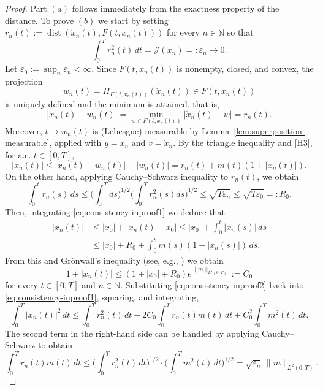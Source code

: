 \documentclass[11pt]{elsarticle}
\theoremstyle{definition}
\theoremstyle{remark}
\numberwithin{equation}{section}
\begin{document}
	\begin{proof}
		Part $(a)$ follows immediately from the exactness property of the distance. To prove $(b)$ we start by setting $r_n(t) := \operatorname{dist}(\dot{x}_n(t), F(t, x_n(t)))$ for every $n\in\mathbb{N}$ so that
		\[
		\int_0^T r_n^2(t) \, dt = \mathcal{J}(x_n) =: \varepsilon_n \to 0.
		\]
		Let $\varepsilon_0 := \sup_n \varepsilon_n < \infty$. Since  $F(t, x_n(t))$ is nonempty, closed,  and convex, the projection
		\[
		w_n(t) = \Pi_{F(t, x_n(t))}(\dot{x}_n(t)) \in F(t, x_n(t))
		\]
		is uniquely defined and the minimum is attained, that is,
		\[
		|\dot{x}_n(t) - w_n(t)| =\min_{w\in F(t, x_n(t))} |\dot{x}_n(t) - w| =r_n(t).
		\]
		Moreover, $t\mapsto w_n(t)$ is (Lebesgue) measurable by
		Lemma~\ref{lem:superposition-measurable}, applied with $y=x_n$ and
		$v=\dot{x}_n$.
		By the triangle inequality and \ref{H3}, for a.e. $t\in[0,T]$,
		\begin{equation}\label{eq:consistency-inproof1}
			|\dot{x}_n(t)| \le |\dot{x}_n(t) - w_n(t)|+|w_n(t)|= r_n(t) + m(t)(1 + |x_n(t)|).
		\end{equation}
		On the other hand, applying Cauchy–Schwarz inequality to $r_n(t)$, we obtain 
		\[
		\int_0^t r_n(s) \, ds  \le \Big(\int_0^T ds\Big)^{1/2}\Big(\int_0^T r^2_n(s)ds\Big)^{1/2}
		\leq  \sqrt{T \varepsilon_n}\le  \sqrt{T \varepsilon_0} =: R_0.
		\]
		Then, integrating \eqref{eq:consistency-inproof1} we deduce that
		\begin{align*}
			|x_n(t)| & \le |x_0|  + |x_n(t)-x_0|
			\leq |x_0| + \int_0^t |\dot{x}_n(s)|\, ds
			\\ & 
			\le |x_0| + R_0 + \int_0^t m(s)(1 + |x_n(s)|) \, ds.
		\end{align*}
		From this and Gr\"{o}nwall's inequality (see, e.g., \cite[pp.\,12--14]{pachpatte1998}) we obtain
		\begin{equation}\label{eq:consistency-inproof2}
			1 + |x_n(t)| \le (1 + |x_0| + R_0 )e^{\|m\|_{L^1(0,T)}}:=C_0
		\end{equation}
		for every $t \in [0,T]$ and $n\in\mathbb{N}$.
		Substituting \eqref{eq:consistency-inproof2} back into \eqref{eq:consistency-inproof1}, squaring, and integrating,
		\[
		\int_0^T |\dot{x}_n(t)|^2 \, dt \le \int_0^T r_n^2(t) \, dt + 2C_0 \int_0^T r_n(t) m(t) \, dt 
		+ C_0^2 \int_0^T m^2(t) \, dt.
		\]
		The second term in the right-hand side can be handled by
		applying Cauchy--Schwarz to obtain
		\[
		\int_0^T r_n(t) m(t) \, dt \le \Big(\int_0^T r_n^2(t) \, dt\Big)^{1/2} \cdot \Big(\int_0^T m^2(t) \, dt \Big)^{1/2} 
		= \sqrt{\varepsilon_n} \, \|m\|_{L^2(0,T)}.
\]
\end{proof}
\end{document}
